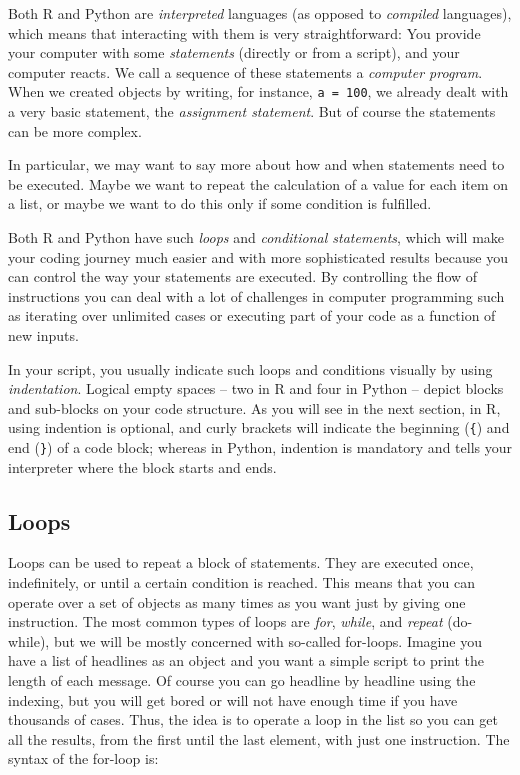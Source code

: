 Both R and Python are \emph{interpreted} languages (as opposed to
\emph{compiled} languages), which means that interacting with
them is very straightforward: You provide your computer with some
\emph{statements} (directly or from a script), and your computer
reacts. We call a sequence of these statements a \emph{computer program}.
When we created objects by writing, for instance,
\verb|a = 100|,  we already dealt with a very basic statement, the \emph{assignment statement}. But of course the statements can be more complex.

In particular, we may want to say more about how and when
statements need to be executed. Maybe we want to repeat
the calculation of a value for each item on a list, or maybe
we want to do this only if some condition is fulfilled.

Both R and Python have such \emph{loops} and \emph{conditional statements}, which will
make your coding journey much easier and with more sophisticated
results because you can control the way your statements are
executed. By controlling the flow of instructions you can deal with a
lot of challenges in computer programming such as iterating over
unlimited cases or executing part of your code as a function of new
inputs.

In your script, you usually indicate such loops and conditions
visually by using \emph{indentation}. Logical empty spaces -- two in R and four in
Python -- depict blocks and sub-blocks on your code structure.
As you will see in the next section, in R, using indention
is optional, and curly brackets will indicate the beginning (\verb|{|)
and end (\verb|}|) of a code block; whereas in Python, indention
is mandatory and tells your interpreter where the block
starts and ends.





\subsection{Loops} \label{sec:loops}

Loops can be used to repeat a block of statements.
They are executed once, indefinitely, or
until a certain condition is reached. This means that you can operate
over a set of objects as many times as you want just by giving one
instruction. The most common types of loops are \emph{for},
\emph{while}, and \emph{repeat} (do-while), but we will be mostly
concerned with so-called for-loops. Imagine you have a list of
headlines as an object and you want a simple script
to print the length of each message. Of course you can go headline
by headline using the indexing, but you will get bored or will not
have  enough time if you have thousands of cases. Thus, the idea is to
operate a loop in the list so you can get all the results, from the
first until the last element, with just one instruction.  The syntax
of the for-loop is:

